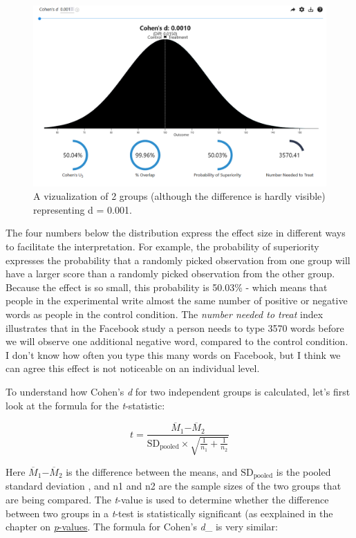 \documentclass[
]{krantz}
\begin{document}
\begin{figure}

{\centering \includegraphics[width=1\linewidth]{images/rpsychd1} 

}

\caption{A vizualization of 2 groups (although the difference is hardly visible) representing d = 0.001.}\label{fig:rpsychd1}
\end{figure}

The four numbers below the distribution express the effect size in different ways to facilitate the interpretation. For example, the probability of superiority expresses the probability that a randomly picked observation from one group will have a larger score than a randomly picked observation from the other group. Because the effect is so small, this probability is 50.03\% - which means that people in the experimental write almost the same number of positive or negative words as people in the control condition. The \emph{number needed to treat} index illustrates that in the Facebook study a person needs to type 3570 words before we will observe one additional negative word, compared to the control condition. I don't know how often you type this many words on Facebook, but I think we can agree this effect is not noticeable on an individual level.

To understand how Cohen's \emph{d} for two independent groups is calculated, let's first look at the formula for the \emph{t}-statistic:

\[
t = \frac{{\overline{M}}_{1}{- \overline{M}}_{2}}{\text{SD}_{\text{pooled}} \times \sqrt{\frac{1}{n_{1}} + \frac{1}{n_{2}}}}
\]

Here \({\overline{M}}_{1}{- \overline{M}}_{2}\) is the difference between the means, and \(\text{SD}_{\text{pooled}}\) is the pooled standard deviation \citep{lakens_calculating_2013}, and n1 and n2 are the sample sizes of the two groups that are being compared. The \emph{t}-value is used to determine whether the difference between two groups in a \emph{t}-test is statistically significant (as eexplained in the chapter on \protect\hyperlink{pvalue}{\emph{p}-values}. The formula for Cohen's \emph{d}\_ is very similar:
\end{document}
